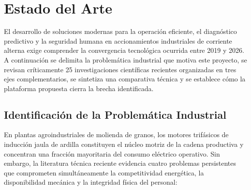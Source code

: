 \section{Estado del Arte}\label{sec:estado_arte}

El desarrollo de soluciones modernas para la operación eficiente, el diagnóstico predictivo y la seguridad humana en accionamientos industriales de corriente alterna exige comprender la convergencia tecnológica ocurrida entre 2019 y 2026. A continuación se delimita la problemática industrial que motiva este proyecto, se revisan críticamente 25 investigaciones científicas recientes organizadas en tres ejes complementarios, se sintetiza una comparativa técnica y se establece cómo la plataforma propuesta cierra la brecha identificada.

\subsection{Identificación de la Problemática Industrial}\label{subsec:problematica_ea}

En plantas agroindustriales de molienda de granos, los motores trifásicos de inducción jaula de ardilla constituyen el núcleo motriz de la cadena productiva y concentran una fracción mayoritaria del consumo eléctrico operativo. Sin embargo, la literatura técnica reciente evidencia cuatro problemas persistentes que comprometen simultáneamente la competitividad energética, la disponibilidad mecánica y la integridad física del personal:

